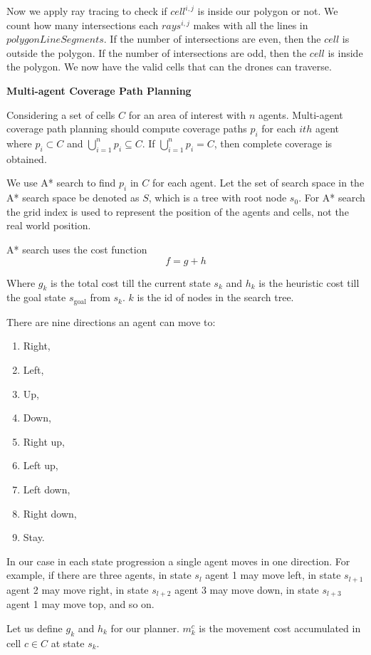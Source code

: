 Now we apply ray tracing to check if $cell^{i,j}$ is inside our polygon or not. We count how many intersections each $rays^{i,j}$ makes with all the lines in $polygonLineSegments$. If the number of intersections are even, then the $cell$ is outside the polygon. If the number of intersections are odd, then the $cell$ is inside the polygon. We now have the valid cells that can the drones can traverse.


\textbf{Multi-agent Coverage Path Planning}

Considering a set of cells  $C$ for an area of interest with $n$ agents.  Multi-agent coverage path planning should compute coverage paths $p_i$ for each $ith$ agent where $p_i \subset C$ and  $\bigcup\limits_{i=1}^{n} p_i \subseteq C$. If $\bigcup\limits_{i=1}^{n} p_i = C$, then complete coverage is obtained. 

We use A* search to find $p_i$ in $C$ for each agent. Let the set of search space in the A* search space be denoted as $S$, which is a tree with root node $s_0$. For A* search the grid index is used to represent the position of the agents and cells, not the real world position. 

A* search uses the cost function
$$ f = g + h $$

Where $g_k$ is the total cost till the current state $s_k$ and $h_k$ is the heuristic cost till the goal state $s_\text{goal}$ from $s_k$. $k$ is the id of nodes in the search tree.


There are nine directions an agent can move to:
\begin{enumerate}
	\item Right,
	\item Left,
	\item Up,
	\item Down,
	\item Right up,
	\item Left up,
	\item Left down, 
	\item Right down,
	\item Stay.
\end{enumerate}


In our case in each state progression a single agent moves in one direction.  For example, if there are three agents, in state $s_l$ agent 1 may move left, in state $s_{l+1}$ agent 2 may move right, in state $s_{l+2}$ agent 3 may move down, in state $s_{l+3}$ agent 1 may move top, and so on.

Let us define $g_k$ and $h_k$ for our planner. $m_k^c$ is the movement cost accumulated in cell $c \in C$ at state $s_k$. 

